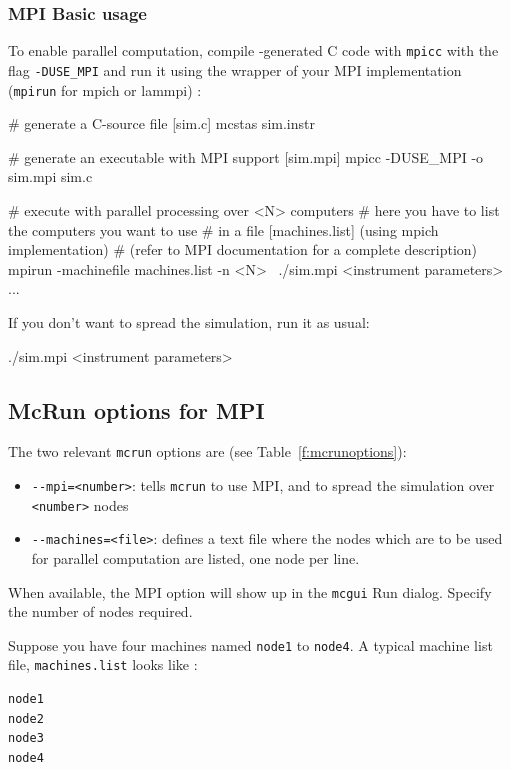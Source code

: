 \subsubsection{MPI Basic usage}

To enable parallel computation, compile \mcs-generated C code
with \verb'mpicc' with the flag \verb'-DUSE_MPI' and run it using the
wrapper of your MPI implementation (\verb'mpirun' for mpich or lammpi) :
\begin{bash}
  # generate a C-source file [sim.c]
  mcstas sim.instr

  # generate an executable with MPI support [sim.mpi]
  mpicc -DUSE_MPI -o sim.mpi sim.c

  # execute with parallel processing over <N> computers
  # here you have to list the computers you want to use
  # in a file [machines.list] (using mpich implementation)
  # (refer to MPI documentation for a complete description)
  mpirun -machinefile machines.list -n <N> \
         ./sim.mpi <instrument parameters>
  ...
\end{bash}

If you don't want to spread the simulation, run it as usual:
\begin{bash}
  ./sim.mpi <instrument parameters>
\end{bash}

\subsection{McRun options for MPI}

The two relevant \verb+mcrun+ options are (see Table~\ref{f:mcrunoptions}):
\begin{itemize}
\item \verb'--mpi=<number>': tells \verb'mcrun' to use MPI, and to
  spread the simulation over \verb'<number>' nodes
\item \verb'--machines=<file>': defines a text file where the nodes which are to
  be used for parallel computation are listed, one node per line.
\end{itemize}
When available, the MPI option will show up in the \verb+mcgui+ Run
dialog. Specify the number of nodes required.

Suppose you have four machines named \verb'node1' to \verb'node4'.
A typical machine list file, \verb'machines.list' looks like :
\begin{lstlisting}
node1
node2
node3
node4
\end{lstlisting}

